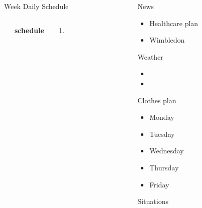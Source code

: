 \documentclass[serif, mathserif, final]{beamer}
\begin{document}
\begin{frame}{}
\begin{columns}
\begin{column}{0.50\linewidth}
\begin{block}{Week Daily Schedule}
\begin{columns}
\begin{itemize}
          \end{itemize}
          \textbf{\small schedule}\\
          \begin{enumerate} 
            \tiny \item \tiny 
          \end{enumerate} 
        \end{columns}
      \end{block}
    \end{column}%
    
    \begin{column}{0.20\linewidth}
      \begin{block}{News}
        \begin{itemize}   
          \tiny \item \tiny Healthcare plan 
        \item \tiny Wimbledon 
        \end{itemize}
      \end{block}
      \begin{block}{Weather} 
        \begin{itemize}
          \tiny \item \tiny 
        \item \tiny 
        \end{itemize}
      \end{block} 
      \begin{block}{Clothes plan} 
        \begin{itemize} 
          \tiny \item \tiny Monday
        \item \tiny Tuesday
        \item \tiny Wednesday
        \item \tiny Thursday
        \item \tiny Friday
        \end{itemize} 
      \end{block}

      \begin{block}{Situations}
        
        \begin{itemize} 


\end{itemize}
\end{block}
\end{column}
\end{columns}
\end{frame}
\end{document}
